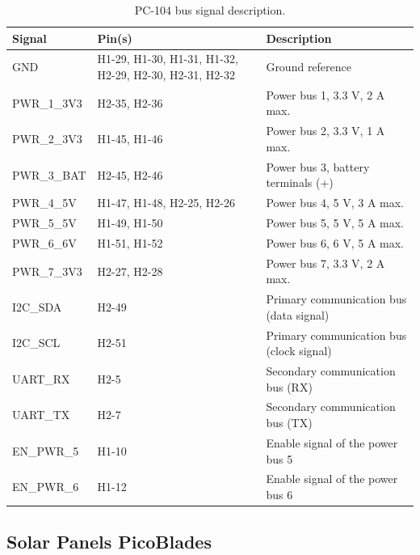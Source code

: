 \begin{table}[!h]
    \centering
    \begin{tabular}{lL{0.29\textwidth}L{0.47\textwidth}}
        \toprule[1.5pt]
        \textbf{Signal}  & \textbf{Pin(s)}            & \textbf{Description} \\
        \midrule
        GND              & H1-29, H1-30, H1-31, H1-32, H2-29, H2-30, H2-31, H2-32 & Ground reference \\
        PWR\_1\_3V3      & H2-35, H2-36               & Power bus 1, 3.3 V, 2 A max. \\
        PWR\_2\_3V3      & H1-45, H1-46               & Power bus 2, 3.3 V, 1 A max. \\
        PWR\_3\_BAT      & H2-45, H2-46               & Power bus 3, battery terminals (+) \\
        PWR\_4\_5V       & H1-47, H1-48, H2-25, H2-26 & Power bus 4, 5 V, 3 A max. \\
        PWR\_5\_5V       & H1-49, H1-50               & Power bus 5, 5 V, 5 A max. \\
        PWR\_6\_6V       & H1-51, H1-52               & Power bus 6, 6 V, 5 A max. \\
        PWR\_7\_3V3      & H2-27, H2-28               & Power bus 7, 3.3 V, 2 A max. \\
        I2C\_SDA         & H2-49                      & Primary communication bus (data signal) \\
        I2C\_SCL         & H2-51                      & Primary communication bus (clock signal) \\
        UART\_RX         & H2-5                       & Secondary communication bus (RX) \\
        UART\_TX         & H2-7                       & Secondary communication bus (TX) \\
        EN\_PWR\_5       & H1-10                      & Enable signal of the power bus 5 \\
        EN\_PWR\_6       & H1-12                      & Enable signal of the power bus 6 \\
        \bottomrule[1.5pt]
    \end{tabular}
    \caption{PC-104 bus signal description.}
    \label{tab:pc104-signals}
\end{table}

\subsection{Solar Panels PicoBlades} \label{solar-panels-picoblades}

